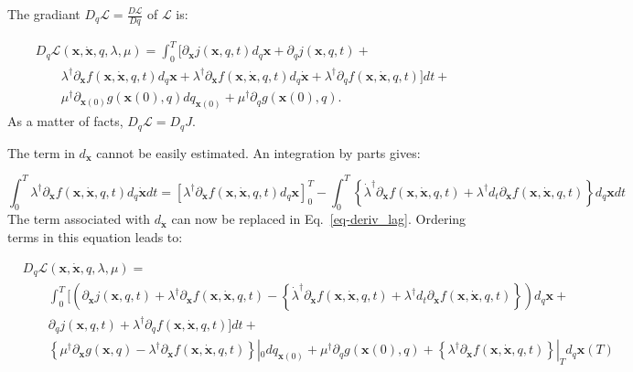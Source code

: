 \documentclass[aip,pof,nofootinbib,reprint,onecolumn]{revtex4-1}
\newcommand{\gras}[1]{\boldsymbol{#1}}
\newcommand{\mypar}[1]{\left(#1\right)}
\newcommand{\mya}[1]{\left\{#1\right\}}
\newcommand{\fdyn}{f} %
\newcommand{\costf}{J} %
\newcommand{\costff}{j} %
\newcommand{\lag}{\mathcal{L}} %
\newcommand{\point}{\gras{x}} %
\begin{document}
The gradiant $D_q\lag = \frac{D\lag}{Dq}$ of $\lag$ is:

\begin{equation}
\begin{split}
&D_q\lag\mypar{\point,\dot{\point},q,\lambda,\mu} = \int_0^T  \bigg[\partial_{\point}\costff(\point,q,t)d_q \point  +\partial_{q} \costff(\point,q,t) + \\
& \qquad \lambda^{\dagger} \partial_{\point}  \fdyn(\point,\dot{\point},q,t) d_q \point + \lambda^{\dagger}\partial_{\dot{\point}} \fdyn(\point,\dot{\point},q,t)d_q \dot{\point}  + \lambda^{\dagger}\partial_q\fdyn(\point,\dot{\point},q,t) \bigg]dt + \\
& \qquad \mu^{\dagger} \partial_{\point(0)} g(\point(0),q) dq_{\point(0)}  + \mu^{\dagger} \partial_q g(\point(0),q) .
\end{split}
\label{eq-deriv_lag}
\end{equation}
As a matter of facts, $D_q\lag = D_q \costf$.

The term in $d_{\dot{\point}}$ cannot be easily estimated. An integration by parts gives:

$$\int_0^T\lambda^{\dagger}\partial_{\dot{\point}} \fdyn(\point,\dot{\point},q,t)d_q \dot{\point} dt = [\lambda^{\dagger}\partial_{\dot{\point}} \fdyn(\point,\dot{\point},q,t) d_q \point ]_0^T - \int_0^T \mya{\dot{\lambda}^{\dagger}\partial_{\dot{\point}} \fdyn(\point,\dot{\point},q,t) + \lambda^{\dagger}d_t\partial_{\dot{\point}}\fdyn(\point,\dot{\point},q,t)}d_q \point dt$$
The term associated with $d_{\dot{\point}}$ can now be replaced in Eq.~\eqref{eq-deriv_lag}.
Ordering terms in this equation leads to:

\begin{equation}
\begin{split}
&D_q\lag\mypar{\point,\dot{\point},q,\lambda,\mu} = \\
& \qquad \int_0^T  \bigg[  \mypar{\partial_{\point}\costff(\point,q,t) + \lambda^{\dagger} \partial_{\point}  \fdyn(\point,\dot{\point},q,t) - \mya{\dot{\lambda}^{\dagger}\partial_{\dot{\point}} \fdyn(\point,\dot{\point},q,t) + \lambda^{\dagger}d_t\partial_{\dot{\point}}\fdyn(\point,\dot{\point},q,t)}} d_q \point   +\\
& \qquad \partial_{q} \costff(\point,q,t)    + \lambda^{\dagger}\partial_q\fdyn(\point,\dot{\point},q,t) \bigg] dt + \\
& \qquad \mya{\mu^{\dagger} \partial_{\point} g(\point,q) - \lambda^{\dagger}\partial_{\dot{\point}} \fdyn(\point,\dot{\point},q,t) }|_0 dq_{\point(0)}  + \mu^{\dagger} \partial_q g(\point(0),q) + \mya{\lambda^{\dagger}\partial_{\dot{\point}} \fdyn(\point,\dot{\point},q,t)}|_T d_q \point(T)
\end{split}
\label{eq-deriv_ord}
\end{equation}
\end{document}
